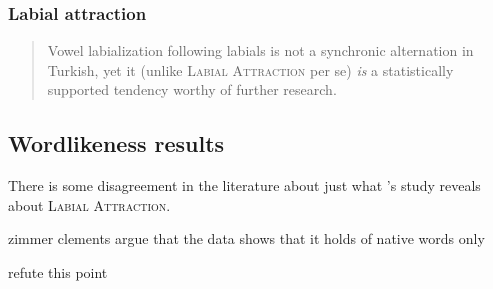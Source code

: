 
\subsubsection{Labial attraction}

\begin{quote}
Vowel labialization following labials is not a synchronic alternation in Turkish, yet it (unlike \textsc{Labial Attraction} per se) \emph{is} a statistically supported tendency worthy of further research. \citep[][196, emphasis in original]{Inkelas2001} 
\end{quote}



\subsection{Wordlikeness results}

There is some disagreement in the literature about just what \citeauthor{Zimmer1969}'s study reveals about \textsc{Labial Attraction}.

zimmer
clements
\citet{Ito1993} 
argue that the data shows that it holds of native words only


\citet{Inkelas2001} refute this point


